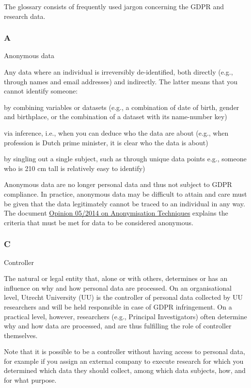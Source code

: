 \documentclass[
]{book}
\begin{document}
The glossary consists of frequently used jargon concerning the GDPR and research data.

\hypertarget{a}{%
\subsubsection{A}\label{a}}

Anonymous data

Any data where an individual is irreversibly de-identified, both directly
(e.g., through names and email addresses) and indirectly. The latter means
that you cannot identify someone:

by combining variables or datasets (e.g., a combination of date of birth,
gender and birthplace, or the combination of a dataset with its name-number key)

via inference, i.e., when you can deduce who the data are about (e.g.,
when profession is Dutch prime minister, it is clear who the data is about)

by singling out a single subject, such as through unique data points
e.g., someone who is 210 cm tall is relatively easy to identify)

Anonymous data are no longer personal data and thus not subject to GDPR
compliance. In practice, anonymous data may be difficult to attain and care
must be given that the data legitimately cannot be traced to an individual in
any way. The document
\href{https://ec.europa.eu/justice/article-29/documentation/opinion-recommendation/files/2014/wp216_en.pdf}{Opinion 05/2014 on Anonymisation Techniques}
explains the criteria that must be met for data to be considered anonymous.

\hypertarget{c}{%
\subsubsection{C}\label{c}}

Controller

The natural or legal entity that, alone or with others, determines or has an
influence on why and how personal data are processed. On an
organisational level, Utrecht University (UU) is the controller of personal
data collected by UU researchers and will be held responsible in case of GDPR
infringement. On a practical level, however, researchers (e.g., Principal
Investigators) often determine why and how data are processed, and are thus
fulfilling the role of controller themselves.

Note that it is possible to be a controller without having access to personal
data, for example if you assign an external company to execute research for
which you determined which data they should collect, among which data subjects,
how, and for what purpose.
\end{document}
